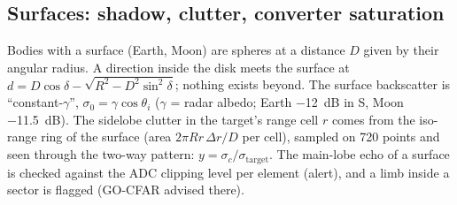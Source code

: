 \documentclass[11pt,a4paper]{article}
\begin{document}
\subsection{Surfaces: shadow, clutter, converter saturation}
Bodies with a surface (Earth, Moon) are spheres at a distance $D$ given by their angular radius. A direction inside the
disk meets the surface at $d = D\cos\delta - \sqrt{R^2 - D^2\sin^2\delta}$; nothing exists beyond. The surface
backscatter is ``constant-$\gamma$'', $\sigma_0 = \gamma\cos\theta_i$ ($\gamma$ = radar albedo; Earth \SI{-12}{dB} in
S, Moon \SI{-11.5}{dB}). The sidelobe clutter in the target's range cell $r$ comes from the iso-range ring of the
surface (area $2\pi R r\,\Delta r/D$ per cell), sampled on 720 points and seen through the two-way pattern:
$y = \sigma_c/\sigma_{\mathrm{target}}$. The main-lobe echo of a surface is checked against the ADC clipping level per
element (alert), and a limb inside a sector is flagged (GO-CFAR advised there).
\end{document}
